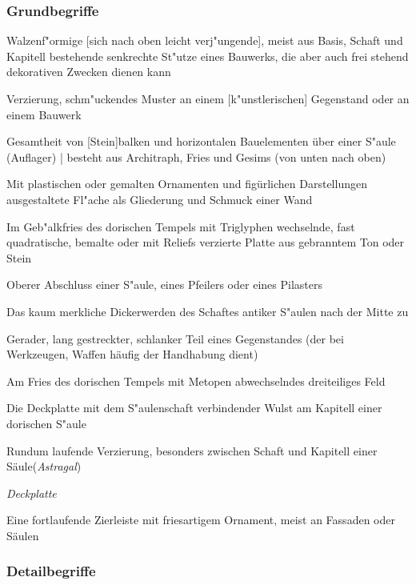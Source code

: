 \documentclass[]{scrartcl}
\begin{document}
\subsubsection{Grundbegriffe}

\begin{description}[leftmargin=!,labelwidth=\widthof{\bfseries P2}]
  \item[S"aule] Walzenf"ormige [sich nach oben leicht verj"ungende], meist aus Basis, Schaft und Kapitell bestehende senkrechte St"utze eines Bauwerks, die aber auch frei stehend dekorativen Zwecken dienen kann
  \item[Ornament] Verzierung, schm"uckendes Muster an einem [k"unstlerischen] Gegenstand oder an einem Bauwerk
  \item[Geb"alk] Gesamtheit von [Stein]balken und horizontalen Bauelementen über einer S"aule (Auflager) | besteht aus Architraph, Fries und Gesims (von unten nach oben)
  \item[Fries] Mit plastischen oder gemalten Ornamenten und figürlichen Darstellungen ausgestaltete Fl"ache als Gliederung und Schmuck einer Wand
  \item[Metope] Im Geb"alkfries des dorischen Tempels mit Triglyphen wechselnde, fast quadratische, bemalte oder mit Reliefs verzierte Platte aus gebranntem Ton oder Stein
  \item[Kapitell] Oberer Abschluss einer S"aule, eines Pfeilers oder eines Pilasters
  \item[Entasis] Das kaum merkliche Dickerwerden des Schaftes antiker S"aulen nach der Mitte zu
  \item[Schaft] Gerader, lang gestreckter, schlanker Teil eines Gegenstandes (der bei Werkzeugen, Waffen häufig der Handhabung dient)
  \item[Triglyph] Am Fries des dorischen Tempels mit Metopen abwechselndes dreiteiliges Feld
  \item[Echinus] Die Deckplatte mit dem S"aulenschaft verbindender Wulst am Kapitell einer dorischen S"aule
  \item[Perlenstab] Rundum laufende Verzierung, besonders zwischen Schaft und Kapitell einer Säule(\emph{Astragal})
  \item[Abakus] \emph{Deckplatte}
  \item[Eierstab] Eine fortlaufende Zierleiste mit friesartigem Ornament, meist an Fassaden oder Säulen
\end{description}

\subsubsection{Detailbegriffe}
\end{document}
